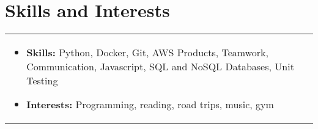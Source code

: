\documentclass[a4paper,8pt]{article}
\begin{document}

\section{Skills and Interests}
\begin{tabularx}{\linewidth}{ @{}l r@{} }
\begin{minipage}[t]{\linewidth}
    \begin{itemize}[nosep,after=\strut, leftmargin=2em, itemsep=2pt]
        \item \textbf{Skills:} Python, Docker, Git, AWS Products, Teamwork, Communication, Javascript, SQL and NoSQL Databases, Unit Testing
        \item \textbf{Interests:} Programming, reading, road trips, music, gym
    \end{itemize}
\end{minipage}
\end{tabularx}

\end{document}
